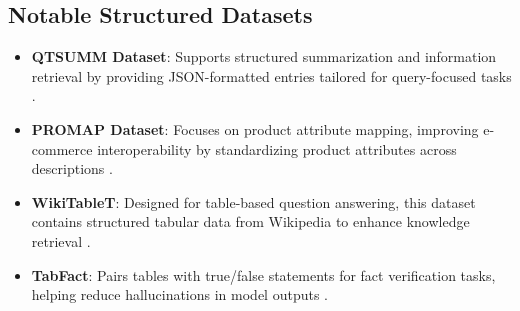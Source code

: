 \subsection{Notable Structured Datasets}
\begin{itemize}
    \item \textbf{QTSUMM Dataset}: Supports structured summarization and information retrieval by providing JSON-formatted entries tailored for query-focused tasks \cite{zhao2023qtsummqueryfocusedsummarizationtabular}.
    \item \textbf{PROMAP Dataset}: Focuses on product attribute mapping, improving e-commerce interoperability by standardizing product attributes across descriptions \cite{macková2023promapdatasetsproductmapping}.
    \item \textbf{WikiTableT}: Designed for table-based question answering, this dataset contains structured tabular data from Wikipedia to enhance knowledge retrieval \cite{chen2021wikitabletlargescaledatatotextdataset}.
    \item \textbf{TabFact}: Pairs tables with true/false statements for fact verification tasks, helping reduce hallucinations in model outputs \cite{chen2020tabfactlargescaledatasettablebased}.
\end{itemize}

